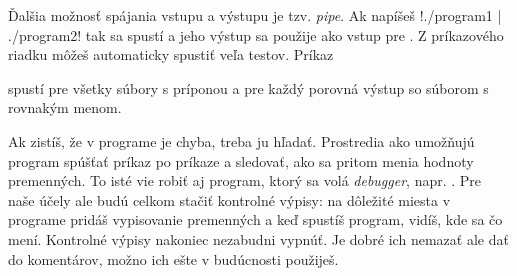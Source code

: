 Ďalšia možnosť spájania vstupu a výstupu je tzv. {\em pipe}. Ak napíšeš
\prg!./program1 | ./program2! tak sa spustí  a jeho výstup sa použije
ako vstup pre .  Z príkazového riadku môžeš automaticky spustiť veľa testov.
Príkaz


spustí  pre všetky súbory s príponou  a pre každý porovná výstup so
súborom  s rovnakým menom. 

Ak zistíš, že v programe je chyba, treba ju hľadať. Prostredia ako  umožňujú program
spúšťať príkaz po príkaze a sledovať, ako sa pritom menia hodnoty premenných. To isté vie robiť
aj program, ktorý sa volá {\em debugger}, napr. . Pre naše účely ale budú celkom stačiť kontrolné výpisy: na dôležité miesta v programe pridáš vypisovanie premenných a keď spustíš program, vidíš, 
kde sa čo mení. Kontrolné výpisy nakoniec nezabudni vypnúť. Je dobré ich nemazať ale dať do komentárov, 
možno ich ešte v budúcnosti použiješ.
